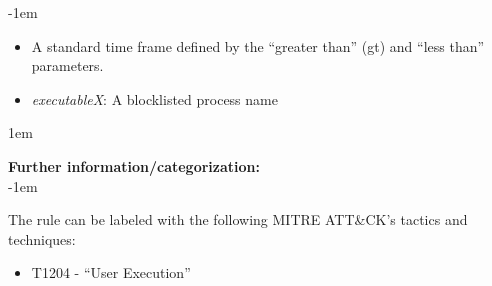\openup -1em
\vspace{-2em}

\begin{itemize}
	\item A standard time frame defined by the ``greater than'' (gt) and ``less than'' parameters.
	\item \emph{executableX}: A blocklisted process name
\end{itemize}

\openup 1em

{\bf Further information/categorization:} \\

\openup -1em
\vspace{-2em}


The rule can be labeled with the following MITRE ATT\&CK's tactics and techniques:
\begin{itemize}
	\item T1204 - ``User Execution''
\end{itemize}

\pagebreak

